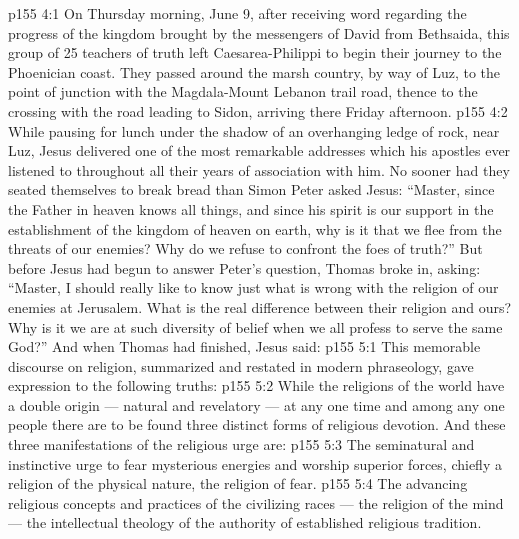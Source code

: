 \vs p155 4:1 On Thursday morning, June 9, after receiving word regarding the progress of the kingdom brought by the messengers of David from Bethsaida, this group of 25 teachers of truth left Caesarea\hyp{}Philippi to begin their journey to the Phoenician coast. They passed around the marsh country, by way of Luz, to the point of junction with the Magdala\hyp{}Mount Lebanon trail road, thence to the crossing with the road leading to Sidon, arriving there Friday afternoon.
\vs p155 4:2 While pausing for lunch under the shadow of an overhanging ledge of rock, near Luz, Jesus delivered one of the most remarkable addresses which his apostles ever listened to throughout all their years of association with him. No sooner had they seated themselves to break bread than Simon Peter asked Jesus: “Master, since the Father in heaven knows all things, and since his spirit is our support in the establishment of the kingdom of heaven on earth, why is it that we flee from the threats of our enemies? Why do we refuse to confront the foes of truth?” But before Jesus had begun to answer Peter’s question, Thomas broke in, asking: “Master, I should really like to know just what is wrong with the religion of our enemies at Jerusalem. What is the real difference between their religion and ours? Why is it we are at such diversity of belief when we all profess to serve the same God?” And when Thomas had finished, Jesus said: 
\vs p155 5:1 This memorable discourse on religion, summarized and restated in modern phraseology, gave expression to the following truths:
\vs p155 5:2 \pc While the religions of the world have a double origin --- natural and revelatory --- at any one time and among any one people there are to be found three distinct forms of religious devotion. And these three manifestations of the religious urge are:
\vs p155 5:3 \bibnobreakspace {} The seminatural and instinctive urge to fear mysterious energies and worship superior forces, chiefly a religion of the physical nature, the religion of fear.
\vs p155 5:4 \bibnobreakspace {} The advancing religious concepts and practices of the civilizing races --- the religion of the mind --- the intellectual theology of the authority of established religious tradition.
